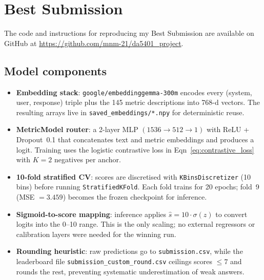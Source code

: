 \documentclass[11pt]{article}
\begin{document}
\newpage
\section{Best Submission}
The code and instructions for reproducing my Best Submission are available on GitHub at \url{https://github.com/mnm-21/da5401_project}.
\label{sec:best}
\subsection{Model components}
\begin{itemize}
  \item \textbf{Embedding stack}: \texttt{google/embeddinggemma-300m} encodes every (system, user, response) triple plus the 145 metric descriptions into 768-d vectors. The resulting arrays live in \texttt{saved\_embeddings/*.npy} for deterministic reuse.
  \item \textbf{MetricModel router}: a 2-layer MLP \((1536 \rightarrow 512 \rightarrow 1)\) with ReLU + Dropout~0.1 that concatenates text and metric embeddings and produces a logit. Training uses the logistic contrastive loss in Eqn~\ref{eq:contrastive_loss} with \(K=2\) negatives per anchor.
  \item \textbf{10-fold stratified CV}: scores are discretised with \texttt{KBinsDiscretizer} (10 bins) before running \texttt{StratifiedKFold}. Each fold trains for 20 epochs; fold~9 (MSE \(=3.459\)) becomes the frozen checkpoint for inference.
  \item \textbf{Sigmoid-to-score mapping}: inference applies \(\hat{s}=10\cdot\sigma(z)\) to convert logits into the 0--10 range. This is the only scaling; no external regressors or calibration layers were needed for the winning run.
  \item \textbf{Rounding heuristic}: raw predictions go to \texttt{submission.csv}, while the leaderboard file \texttt{submission\_custom\_round.csv} ceilings scores \(\leq 7\) and rounds the rest, preventing systematic underestimation of weak answers.
\end{itemize}
\end{document}
